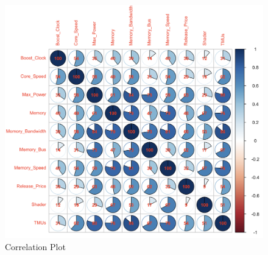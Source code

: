 \documentclass[a4paper]{article}
\theoremstyle{definition}
\begin{document}
\begin{figure}[h!]
\begin{center}
\includegraphics[width=14cm]{images/2.png}
\end{center}
\caption{Correlation Plot}
\end{figure}
\pagebreak
\end{document}
